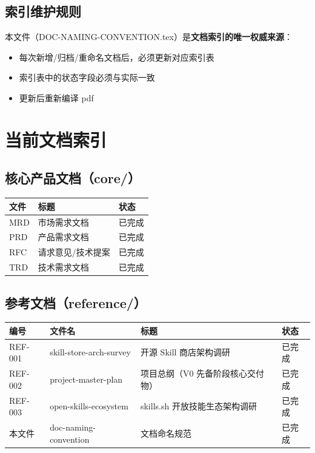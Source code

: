 \documentclass[11pt,a4paper]{article}
\begin{document}
\subsection{索引维护规则}

本文件（DOC-NAMING-CONVENTION.tex）是\textbf{文档索引的唯一权威来源}：

\begin{itemize}[nosep]
  \item 每次新增/归档/重命名文档后，必须更新对应索引表
  \item 索引表中的状态字段必须与实际一致
  \item 更新后重新编译 pdf
\end{itemize}


\section{当前文档索引}

\subsection{核心产品文档（core/）}

\begin{table}[h]
\centering
\begin{tabular}{lll}
\toprule
\textbf{文件} & \textbf{标题} & \textbf{状态} \\
\midrule
MRD & 市场需求文档 & 已完成 \\
PRD & 产品需求文档 & 已完成 \\
RFC & 请求意见/技术提案 & 已完成 \\
TRD & 技术需求文档 & 已完成 \\
\bottomrule
\end{tabular}
\end{table}

\subsection{参考文档（reference/）}

\begin{table}[h]
\centering
\begin{tabular}{llll}
\toprule
\textbf{编号} & \textbf{文件名} & \textbf{标题} & \textbf{状态} \\
\midrule
REF-001 & skill-store-arch-survey & 开源 Skill 商店架构调研 & 已完成 \\
REF-002 & project-master-plan & 项目总纲（V0 先备阶段核心交付物） & 已完成 \\
REF-003 & open-skills-ecosystem & skills.sh 开放技能生态架构调研 & 已完成 \\
本文件 & doc-naming-convention & 文档命名规范 & 已完成 \\
\bottomrule
\end{tabular}
\end{table}
\end{document}
